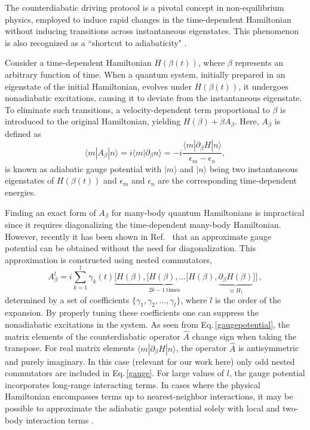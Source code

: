 \documentclass[twocolumn,aps,superscriptaddress,floatfix,longbibliography]{revtex4-2}
\newcommand{\Eq}[1]{Eq.\,\eqref{#1}}
\begin{document}
The counterdiabatic driving protocol is a pivotal concept in
non-equilibrium physics, employed to induce
rapid changes in the time-dependent Hamiltonian without inducing
transitions \cite{demirplak2003adiabatic,sels2017minimizing}
across instantaneous eigenstates.
This phenomenon is also recognized as a ``shortcut to
adiabaticity" \cite{chen2010fast, del2013shortcuts,
guery2019shortcuts,takahashi2019hamiltonian}. 


Consider a time-dependent Hamiltonian $H(\beta(t))$, where
$\beta$ represents an arbitrary function of time. When a quantum system, initially prepared in an eigenstate of the initial Hamiltonian, evolves
under $H(\beta(t))$, it undergoes nonadiabatic excitations,
causing it to deviate from the instantaneous eigenstate. To
eliminate such transitions, a velocity-dependent term
proportional to $\dot{\beta}$ is introduced to the original
Hamiltonian, yielding $H(\beta)+\dot{\beta} A_{\beta}$.
Here, $A_{\beta}$ is defined as
\begin{equation}
\langle m|A_{\beta}|n\rangle=i \langle m|\partial_{\beta} n\rangle=-i\frac{\langle m|\partial_{\beta} H | n\rangle}{\epsilon_{m}-\epsilon_n},
    \label{gaugepotential}
\end{equation}
is known as adiabatic gauge potential
with $|m\rangle$ and $|n\rangle$ being two instantaneous eigenstates of $H(\beta(t))$ and $\epsilon_m$ and $\epsilon_n$ are the corresponding time-dependent energies.


Finding an exact form of $A_{\beta}$ for many-body quantum
Hamiltonians is impractical since it requires diagonalizing the
time-dependent many-body Hamiltonian. However, recently it has been shown in Ref.~\cite{PolkovnikovPRL2019}
that an approximate gauge potential can be obtained without the
need for diagonalization. This approximation is constructed
using %
nested commutators, %
\begin{equation}
  A_{\beta}^{l}=i\sum_{k=1}^{l} \gamma_{k}(t) \underbrace{[H(\beta),[H(\beta),...[H(\beta)}_{2k-1~{\text{times}}},
  \underbrace{\partial_{\beta} H(\beta)}_{
    \equiv H_1
  }]]
\,, \label{gauge}
\end{equation}
determined by a set of coefficients
$\{\gamma_1,\gamma_2,...,\gamma_l \}$, where $l$ is the order of
the expansion. By properly tuning these coefficients one can suppress the nonadiabatic excitations in the system. As seen from \Eq{gaugepotential},
the matrix elements of the counterdiabatic operator
$\hat{A}$ change sign when taking the transpose.
For real matrix elements $\langle m|\partial_{\beta} H | n\rangle$, 
the operator $\hat{A}$ is antisymmetric and purely imaginary.
 In this case (relevant for our work here) only odd nested commutators are \cite{PolkovnikovPRL2019}
included in \Eq{gauge}.
For large values of $l$, the gauge
potential incorporates long-range interacting terms. In cases
where the physical Hamiltonian encompasses terms up to
nearest-neighbor interactions, it may be possible %
to approximate the
adiabatic gauge potential solely with local and two-body
interaction terms \cite{vcepaite2023counterdiabatic}.
\end{document}
